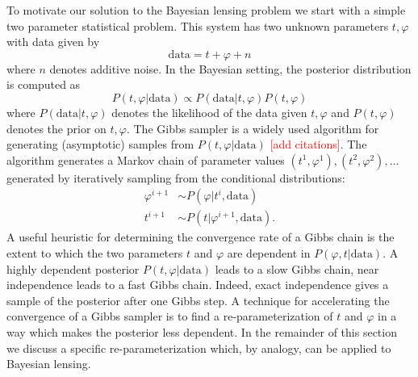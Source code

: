 \documentclass[noinfoline]{imsart}
\begin{document}
To motivate our solution to the Bayesian lensing problem we start with a simple two parameter statistical problem.  This system has two unknown parameters $ t, \varphi$ with data given by
\[\text{data} =  t + \varphi + n\]
where $n$ denotes additive noise.  In the Bayesian setting, the posterior distribution is computed as 
\begin{equation}
\label{post1}
 P( t,\varphi|\text{data})\propto P(\text{data}| t, \varphi) P( t,\varphi) 
 \end{equation}
where $P(\text{data}| t, \varphi)$ denotes the likelihood of the data given  $ t, \varphi$ and $P( t,\varphi)$ denotes the  prior on $ t, \varphi$. 
The Gibbs sampler is a widely used algorithm for generating (asymptotic) samples from  $P( t, \varphi|\text{data})$ \textcolor{red}{[add citations]}. The algorithm generates a Markov chain of parameter values $( t^{1}, \varphi^{1}), ( t^{2}, \varphi^{2}),\ldots$ generated by iteratively sampling from the conditional distributions:
\begin{align*}
\varphi^{i+1}   &\sim P(\varphi| t^{i},\text{data}) \\
 t^{i+1} &\sim P( t|\varphi^{i+1},\text{data}).
\end{align*}
A useful heuristic for determining the convergence rate of a Gibbs chain is the extent to which the two parameters $ t$ and $\varphi$ are dependent in $P(\varphi,  t|\text{data})$. A highly dependent posterior $P( t, \varphi|\text{data})$ leads to a slow Gibbs chain, near independence leads to a fast Gibbs chain. Indeed, exact independence gives a sample of the posterior after one Gibbs step.  A technique for accelerating the convergence of a Gibbs sampler is to find a  re-parameterization of $ t$ and $\varphi$ in a way which makes the posterior less dependent. In the remainder of this section we discuss a specific re-parameterization which, by analogy, can be applied to Bayesian lensing.
\end{document}
